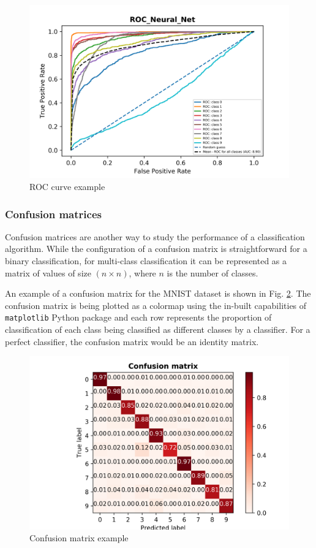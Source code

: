 \documentclass[10pt]{scrartcl}
\begin{document}
\noindent\fbox{\parbox{\textwidth}{}}

\begin{figure}
\centering
\includegraphics[width=0.6\linewidth]{figures/roc_example.png}
\caption{ROC curve example \label{fig:roc_eg}}
\end{figure}

\subsubsection*{Confusion matrices}

Confusion matrices are another way to study the performance of a classification algorithm. While the configuration of a confusion matrix is straightforward for a binary classification, for multi-class classification it can be represented as a matrix of values of size $(n \times n)$, where $n$ is the number of classes.

An example of a confusion matrix for the MNIST dataset is shown in Fig. \ref{fig:conf_eg}. The confusion matrix is being plotted as a colormap using the in-built capabilities of \texttt{matplotlib} Python package and each row represents the proportion of classification of each class being classified as different classes by a classifier. For a perfect classifier, the confusion matrix would be an identity matrix.

\begin{figure}
\centering
\includegraphics[width=0.6\linewidth]{figures/confusion_example.png}
\caption{Confusion matrix example \label{fig:conf_eg}}
\end{figure}
\end{document}
